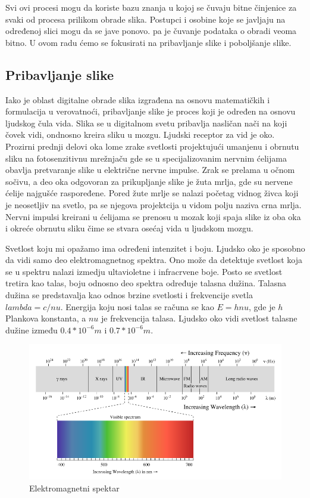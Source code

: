 \documentclass[a4paper,12pt,titlepage]{article}
\begin{document}
Svi ovi procesi mogu da koriste bazu znanja u kojoj se čuvaju bitne činjenice za svaki od procesa prilikom obrade slika. Postupci i osobine koje se javljaju na određenoj slici mogu da se jave ponovo. pa je čuvanje podataka o obradi veoma bitno. U ovom radu ćemo se fokusirati na pribavljanje slike i poboljšanje slike.

\subsection{Pribavljanje slike}%

Iako je oblast digitalne obrade slika izgrađena na osnovu matematičkih i formulacija u verovatnoći, pribavljanje slike je proces koji je određen na osnovu ljudskog čula vida. Slika se u digitalnom svetu pribavlja nasličan nači na koji čovek vidi, ondnosno kreira sliku u mozgu. Ljudski receptor za vid je oko. Prozirni prednji delovi oka lome zrake svetlosti projektujući umanjenu i obrnutu sliku na fotosenzitivnu mrežnjaču gde se u specijalizovanim nervnim ćelijama obavlja pretvaranje slike u električne nervne impulse. Zrak se prelama u očnom sočivu, a deo oka odgovoran za prikupljanje slike je žuta mrlja, gde su nervene ćelije najgušće raspoređene. Pored žute mrlje se nalazi početag vidnog živca koji je neosetljiv na svetlo, pa se njegova projektcija u vidom polju naziva crna mrlja. Nervni impulsi kreirani u ćelijama se prenosu u mozak koji spaja slike iz oba oka i okreće obrnutu sliku čime se stvara osećaj vida u ljudskom mozgu.

Svetlost koju mi opažamo ima određeni intenzitet i boju. Ljudsko oko je sposobno da vidi samo deo elektromagnetnog spektra. Ono može da detektuje svetlost koja se u spektru nalazi izmedju ultavioletne i infracrvene boje. Posto se svetlost tretira kao talas, boju odnosno deo spektra određuje talasna dužina. Talasna dužina se predstavalja kao odnos brzine svetlosti i frekvencije svetla $lambda = c / nu$. Energija koju nosi talas se računa se kao $E = h nu$, gde je $h$ Plankova konstanta, a $nu$ je frekvencija talasa. Ljudsko oko vidi svetlost talasne dužine između $0.4 * 10^{-6}m$ i $0.7 * 10^{-6}m$.

\begin{figure}[ht!]
\centering
\includegraphics[width=120mm]{img/spektar.png}
\caption{Elektromagnetni spektar}
\label{spektar}
\end{figure} 
\end{document}
